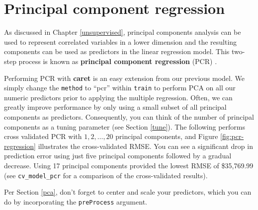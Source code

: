 \documentclass[]{book}
\theoremstyle{definition}
\theoremstyle{definition}
\theoremstyle{definition}
\theoremstyle{remark}
\begin{document}
\hypertarget{principal-component-regression}{%
\section{Principal component
regression}\label{principal-component-regression}}

As discussed in Chapter \ref{unsupervised}, principal components
analysis can be used to represent correlated variables in a lower
dimension and the resulting components can be used as predictors in the
linear regression model. This two-step process is known as
\textbf{principal component regression} (PCR)
\citep{massy1965principal}.

Performing PCR with \textbf{caret} is an easy extension from our
previous model. We simply change the \texttt{method} to ``pcr'' within
\texttt{train} to perform PCA on all our numeric predictors prior to
applying the multiple regression. Often, we can greatly improve
performance by only using a small subset of all principal components as
predictors. Consequently, you can think of the number of principal
components as a tuning parameter (see Section \ref{tune}). The following
performs cross validated PCR with \(1, 2, \dots, 20\) principal
components, and Figure \ref{fig:pcr-regression} illustrates the
cross-validated RMSE. You can see a significant drop in prediction error
using just five principal components followed by a gradual decrease.
Using 17 principal components provided the lowest RMSE of \$35,769.99
(see \texttt{cv\_model\_pcr} for a comparison of the cross-validated
results).

\begin{warning}
Per Section \ref{pca}, don't forget to center and scale your predictors,
which you can do by incorporating the \texttt{preProcess} argument.
\end{warning}
\end{document}
